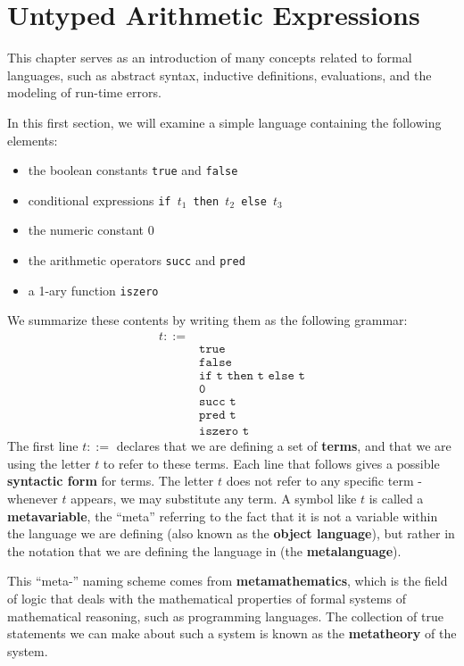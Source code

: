 \documentclass{report}
\newcommand*{\newpar}{\par\vspace{\baselineskip}\noindent}
\newcommand{\ttt}[1]{\texttt{#1}}
\newcommand{\tbf}[1]{\textbf{#1}}
\begin{document}
\section{Untyped Arithmetic Expressions}
This chapter serves as an introduction of many concepts related to formal languages, such as abstract syntax, inductive definitions, evaluations, and the modeling of run-time errors.
\newpar
In this first section, we will examine a simple language containing the following elements:
\begin{itemize}
 \item the boolean constants \texttt{true} and \texttt{false}
 \item conditional expressions \texttt{if $t_1$ then $t_2$ else $t_3$}
 \item the numeric constant $0$
 \item the arithmetic operators \texttt{succ} and \texttt{pred}
 \item a 1-ary function \texttt{iszero}
\end{itemize}
We summarize these contents by writing them as the following grammar:
\begin{align*}
 t ::= &\\
 &\ttt{true}\\
 &\ttt{false}\\
 &\ttt{if t then t else t}\\
 &\ttt{0}\\
 &\ttt{succ t}\\
 &\ttt{pred t}\\
 &\ttt{iszero t}
\end{align*}
The first line $t ::=$ declares that we are defining a set of \tbf{terms}, and that we are using the letter $t$ to refer to these terms. Each line that follows gives a possible \tbf{syntactic form} for terms. The letter $t$ does not refer to any specific term - whenever $t$ appears, we may substitute any term. A symbol like $t$ is called a \tbf{metavariable}, the ``meta'' referring to the fact that it is not a variable within the language we are defining (also known as the \tbf{object language}), but rather in the notation that we are defining the language in (the \tbf{metalanguage}).
\newpar
This ``meta-'' naming scheme comes from \tbf{metamathematics}, which is the field of logic that deals with the mathematical properties of formal systems of mathematical reasoning, such as programming languages. The collection of true statements we can make about such a system is known as the \tbf{metatheory} of the system.
\newpar
\end{document}
